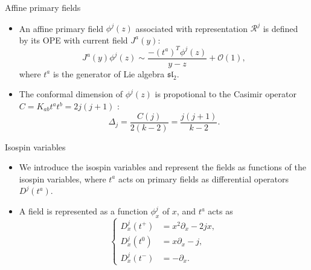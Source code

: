 \documentclass{beamer}
\begin{document}
\begin{frame}{Affine primary fields}
  \begin{itemize}
    \item An affine primary field $\phi^{j}(z)$ associated with representation $\mathcal{R}^{j}$ is defined by its OPE with current field 
      $J^{a}(y)$:
      \begin{equation}
        J^{a}(y) \phi^{j}(z) \sim \frac{-(t^{a})^{T} \phi^{j}(z)}{y-z} + \mathcal{O}(1), \label{OPEJPhi}
      \end{equation}
      where $t^{a}$ is the generator of Lie algebra $\mathfrak{sl}_{2}$.
    \item The conformal dimension of $\phi^{j}(z)$ is propotional to the Casimir operator $C = K_{ab} t^{a} t^{b} = 2j(j+1)$ :
      \begin{equation}
        \Delta_{j} = \frac{C(j)}{2(k-2)} = \frac{j(j+1)}{k-2}.
      \end{equation}
  \end{itemize}
\end{frame}

\begin{frame}{Isospin variables}
    
  \begin{itemize}
    \item We introduce the isospin variables and represent the fields as functions of the isospin variables, 
          where $t^{a}$ acts on primary fields as differential operators $D^{j}(t^{a})$. 
    \item A field is represented as a function $\phi^{j}_{x}$ of $x$, and $t^{a}$ acts as 
      \begin{equation}
          \left\{
              \begin{aligned}
                  D^{j}_{x}(t^{+}) &= x^{2} \partial_{x} - 2 j x, \\
                  D^{j}_{x}(t^{0}) &= x \partial_{x} - j, \\
                  D^{j}_{x}(t^{-}) &= - \partial_{x}.
              \end{aligned}
          \right. \label{Diffx}
      \end{equation}
  \end{itemize}
\end{frame}
\end{document}
